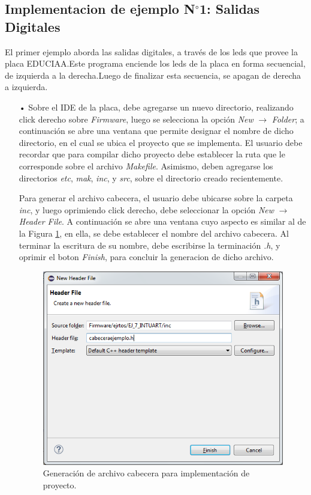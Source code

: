 \documentclass[12pt,letterpaper]{article}
\begin{document}
\subsection{Implementacion de ejemplo N$^{\circ}$1: Salidas Digitales}\label{sec:ej1sapi}
El primer ejemplo aborda las salidas digitales, a través de los leds que provee la placa EDUCIAA.Este programa enciende los leds de la placa en forma secuencial, de izquierda a la derecha.Luego de finalizar esta secuencia, se apagan de derecha a izquierda.
\begin{enumerate}
\item[•]Sobre el IDE de la placa, debe agregarse un nuevo directorio, realizando click derecho sobre \textit{Firmware}, luego se selecciona la opción \textit{New} $\rightarrow$ \textit{Folder}; a continuación se abre una ventana que permite designar el nombre de dicho directorio, en el cual se ubica el proyecto que se implementa. El usuario debe recordar que para compilar dicho proyecto debe establecer la ruta que le corresponde sobre el archivo \textit{Makefile}. Asimismo, deben agregarse los directorios \textit{etc}, \textit{mak}, \textit{inc}, y \textit{src}, sobre el directorio creado recientemente.

Para generar el archivo cabecera, el usuario debe ubicarse sobre la carpeta \textit{inc}, y luego oprimiendo click derecho, debe seleccionar la opción \textit{New} $\rightarrow$ \textit{Header File}. A continuación se abre una ventana cuyo aspecto es similar al de la Figura \ref{archivocabecerasapi1}, en ella, se debe establecer el nombre del archivo cabecera. Al terminar la escritura de su nombre, debe escribirse la terminación \textit{.h}, y oprimir el boton \textit{Finish}, para concluir la generacion de dicho archivo.

\begin{figure}[!h]
\centering
\includegraphics[width=8 cm]{figuras/f27.png}
\caption{Generación de archivo cabecera para implementación de proyecto.}
\label{archivocabecerasapi1}
\end{figure}


\end{enumerate}
\end{document}
